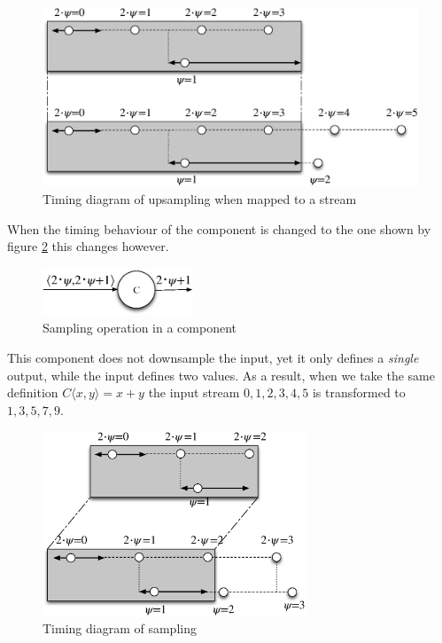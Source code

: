 \begin{figure}[h]
\centering
\includegraphics[width=\textwidth]{images/summap1}
\caption{Timing diagram of upsampling when mapped to a stream}
\label{fig:summap1}
\end{figure}

When the timing behaviour of the component is changed to the one shown by figure \ref{fig:summapc2} this changes however.

\begin{figure}[h]
\centering
\includegraphics[width=0.4\textwidth]{images/summapc2}
\caption{Sampling operation in a component}
\label{fig:summapc2}
\end{figure}

This component does not downsample the input, yet it only defines a \textit{single} output, while the input defines two values.
As a result, when we take the same definition $C \langle x, y \rangle = x + y$ the input stream $0,1,2,3,4,5$ is transformed to $1,3,5,7,9$.

\begin{figure}[h]
\centering
\includegraphics[width=0.7\textwidth]{images/summap2}
\caption{Timing diagram of sampling}
\label{fig:summap2}
\end{figure}

